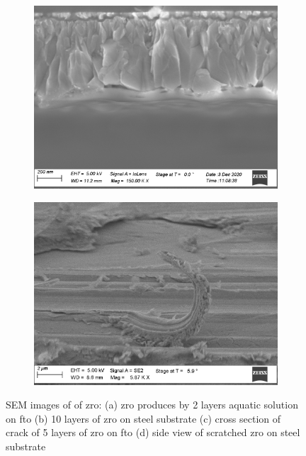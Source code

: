 \begin{figure}[bht]
    \begin{subfigure}{.45\textwidth}
        \centering
        \includegraphics[width=.99\textwidth]{Pics/sem/115_fto_cs_1x.png}
		\caption{}%
		\label{fig:sem-cs1}
    \end{subfigure}
    \begin{subfigure}{.45\textwidth}
        \centering
        \includegraphics[width=.99\textwidth]{Pics/sem/150_steel_cs_2Fx5.png}
		\caption{}%
		\label{fig:sem-cs2}
    \end{subfigure}
	\caption{
		SEM images of of \gls{zro}:
		(a) \gls{zro} produces by 2 layers aquatic solution on \gls{fto}
		(b) 10 layers of \gls{zro} on steel substrate
		(c) cross section of crack of 5 layers of \gls{zro} on \gls{fto}
		(d) side view of scratched \gls{zro} on steel substrate
		\label{fig:sem}
	}
\end{figure}
\enlargethispage{-\baselineskip}

